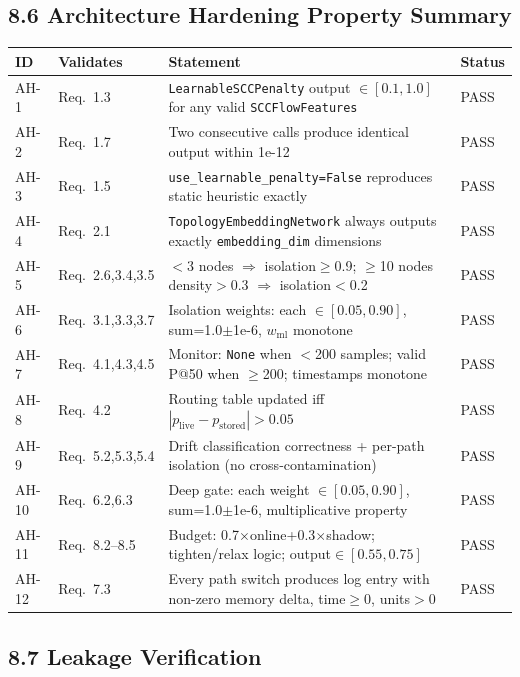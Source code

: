 \documentclass[12pt,a4paper]{article}
\begin{document}
\subsection{8.6 Architecture Hardening Property Summary}

\begin{tabular}{p{1.0cm} p{2.5cm} p{9.5cm} l}
\toprule
ID & Validates & Statement & Status \\
\midrule
AH-1 & Req.~1.3 & \texttt{LearnableSCCPenalty} output $\in[0.1,1.0]$ for any valid \texttt{SCCFlowFeatures} & PASS \\
AH-2 & Req.~1.7 & Two consecutive calls produce identical output within 1e-12 & PASS \\
AH-3 & Req.~1.5 & \texttt{use\_learnable\_penalty=False} reproduces static heuristic exactly & PASS \\
AH-4 & Req.~2.1 & \texttt{TopologyEmbeddingNetwork} always outputs exactly \texttt{embedding\_dim} dimensions & PASS \\
AH-5 & Req.~2.6,3.4,3.5 & $<$3 nodes $\Rightarrow$ isolation$\geq$0.9; $\geq$10 nodes density$>$0.3 $\Rightarrow$ isolation$<$0.2 & PASS \\
AH-6 & Req.~3.1,3.3,3.7 & Isolation weights: each $\in[0.05,0.90]$, sum=1.0$\pm$1e-6, $w_\text{ml}$ monotone & PASS \\
AH-7 & Req.~4.1,4.3,4.5 & Monitor: \texttt{None} when $<$200 samples; valid P@50 when $\geq$200; timestamps monotone & PASS \\
AH-8 & Req.~4.2 & Routing table updated iff $|p_\text{live}-p_\text{stored}|>0.05$ & PASS \\
AH-9 & Req.~5.2,5.3,5.4 & Drift classification correctness + per-path isolation (no cross-contamination) & PASS \\
AH-10 & Req.~6.2,6.3 & Deep gate: each weight $\in[0.05,0.90]$, sum=1.0$\pm$1e-6, multiplicative property & PASS \\
AH-11 & Req.~8.2--8.5 & Budget: 0.7$\times$online+0.3$\times$shadow; tighten/relax logic; output$\in[0.55,0.75]$ & PASS \\
AH-12 & Req.~7.3 & Every path switch produces log entry with non-zero memory delta, time$\geq$0, units$>$0 & PASS \\
\bottomrule
\end{tabular}

\subsection{8.7 Leakage Verification}
\end{document}
